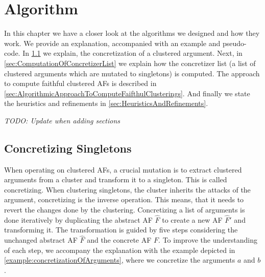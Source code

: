 \chapter{Algorithm}
In this chapter we have a closer look at the algorithms we designed and how they work. We provide an explanation, accompanied with an example and pseudo-code.
In \cref{sec:ConcretizingSingletons} we explain, the concretization of a clustered argument. Next, in \cref{sec:ComputationOfConcretizerList} we explain how the concretizer list (a list of clustered arguments which are mutated to singletons) is computed. The approach to compute faithful clustered AFs is described in \cref{sec:AlgorithmicApproachToComputeFaifthulClusterings}. And finally we state the heuristics and refinements in \cref{sec:HeuristicsAndRefinements}.

\textit{TODO: Update when adding sections}

\section{Concretizing Singletons}
\label{sec:ConcretizingSingletons}
When operating on clustered AFs, a crucial mutation is to extract clustered arguments from a cluster and transform it to a singleton. This is called concretizing. When clustering singletons, the cluster inherits the attacks of the argument, concretizing is the inverse operation. This means, that it needs to revert the changes done by the clustering.
Concretizing a list of arguments is done iteratively by duplicating the abstract AF $\hat{F}$ to create a new AF $\hat{F}'$ and transforming it. The transformation is guided by five steps considering the unchanged abstract AF $\hat{F}$ and the concrete AF $F$. To improve the understanding of each step, we accompany the explanation with the example depicted in \cref{example:concretizationOfArguments}, where we concretize the arguments $a$ and $b$.

\vspace{0.3cm}

